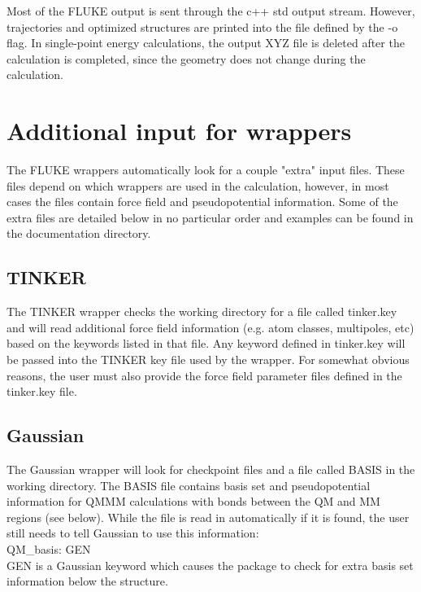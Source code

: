 \documentclass[12pt]{report}
\begin{document}
Most of the FLUKE output is sent through the c++ std output stream. However,
trajectories and optimized structures are printed into the file defined
by the -o flag. In single-point energy calculations, the output XYZ file
is deleted after the calculation is completed, since the geometry does not
change during the calculation.

\section{Additional input for wrappers}

The FLUKE wrappers automatically look for a couple "extra" input files. These
files depend on which wrappers are used in the calculation, however, in most
cases the files contain force field and pseudopotential information. Some of
the extra files are detailed below in no particular order and examples can be
found in the documentation directory.

\subsection{TINKER}

The TINKER wrapper checks the working directory for a file called tinker.key
and will read additional force field information (e.g. atom classes,
multipoles, etc) based on the keywords listed in that file. Any keyword
defined in tinker.key will be passed into the TINKER key file used by the
wrapper. For somewhat obvious reasons, the user must also provide the force
field parameter files defined in the tinker.key file.

\subsection{Gaussian}

The Gaussian wrapper will look for checkpoint files and a file called BASIS in
the working directory. The BASIS file contains basis set and pseudopotential
information for QMMM calculations with bonds between the QM and MM regions
(see below). While the file is read in automatically if it is found, the user
still needs to tell Gaussian to use this information: \\

QM\_basis: GEN \\

GEN is a Gaussian keyword which causes the package to check for extra basis
set information below the structure. \\
\end{document}
